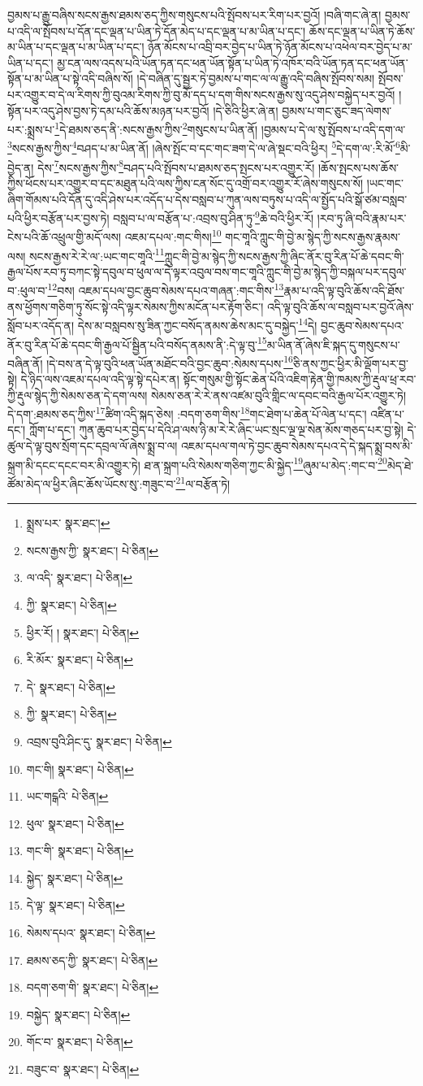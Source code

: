 བྱམས་པ་རྒྱུ་བཞིས་སངས་རྒྱས་ཐམས་ཅད་ཀྱིས་གསུངས་པའི་སྤོབས་པར་རིག་པར་བྱའོ། །བཞི་གང་ཞེ་ན། བྱམས་པ་འདི་ལ་སྤོབས་པ་དོན་དང་ལྡན་པ་ཡིན་ཏེ་དོན་མེད་པ་དང་ལྡན་པ་མ་ཡིན་པ་དང་། ཆོས་དང་ལྡན་པ་ཡིན་ཏེ་ཆོས་མ་ཡིན་པ་དང་ལྡན་པ་མ་ཡིན་པ་དང་། ཉོན་མོངས་པ་འབྲི་བར་བྱེད་པ་ཡིན་ཏེ་ཉོན་མོངས་པ་འཕེལ་བར་བྱེད་པ་མ་ཡིན་པ་དང་། མྱ་ངན་ལས་འདས་པའི་ཡོན་ཏན་དང་ཕན་ཡོན་སྟོན་པ་ཡིན་ཏེ་འཁོར་བའི་ཡོན་ཏན་དང་ཕན་ཡོན་སྟོན་པ་མ་ཡིན་པ་སྟེ་འདི་བཞིས་སོ། །དེ་བཞིན་དུ་སྦྱར་ཏེ་བྱམས་པ་གང་ལ་ལ་རྒྱུ་འདི་བཞིས་སྤོབས་སམ། སྤོབས་པར་འགྱུར་བ་དེ་ལ་རིགས་ཀྱི་བུའམ་རིགས་ཀྱི་བུ་མོ་དད་པ་དག་གིས་སངས་རྒྱས་སུ་འདུ་ཤེས་བསྐྱེད་པར་བྱའོ། །སྟོན་པར་འདུ་ཤེས་བྱས་ཏེ་དམ་པའི་ཆོས་མཉན་པར་བྱའོ། །དེ་ཅིའི་ཕྱིར་ཞེ་ན། བྱམས་པ་གང་ཅུང་ཟད་ལེགས་པར་:སྨྲས་པ་\footnote{སྨྲས་པར་  སྣར་ཐང་། }དེ་ཐམས་ཅད་ནི་:སངས་རྒྱས་ཀྱིས་\footnote{སངས་རྒྱས་ཀྱི་  སྣར་ཐང་།  པེ་ཅིན། }གསུངས་པ་ཡིན་ནོ། །བྱམས་པ་དེ་ལ་སུ་སྤོབས་པ་འདི་དག་ལ་\footnote{ལ་འདི་  སྣར་ཐང་།  པེ་ཅིན། }སངས་རྒྱས་ཀྱིས་\footnote{ཀྱི་  སྣར་ཐང་།  པེ་ཅིན། }བཤད་པ་མ་ཡིན་ནོ། །ཞེས་སྤོང་བ་དང་གང་ཟག་དེ་ལ་ཞེ་སྡང་བའི་ཕྱིར། \footnote{ཕྱིར་རོ། །   སྣར་ཐང་།  པེ་ཅིན། }དེ་དག་ལ་:རི་མོ་\footnote{རི་མོར་  སྣར་ཐང་།  པེ་ཅིན། }མི་བྱེད་ན། དེས་\footnote{དེ་  སྣར་ཐང་།  པེ་ཅིན། }སངས་རྒྱས་ཀྱིས་\footnote{ཀྱི་  སྣར་ཐང་།  པེ་ཅིན། }བཤད་པའི་སྤོབས་པ་ཐམས་ཅད་སྤངས་པར་འགྱུར་རོ། །ཆོས་སྤངས་པས་ཆོས་ཀྱིས་ཕོངས་པར་འགྱུར་བ་དང་མཐུན་པའི་ལས་ཀྱིས་ངན་སོང་དུ་འགྲོ་བར་འགྱུར་རོ་ཞེས་གསུངས་སོ། །ཡང་གང་ཞིག་གོམས་པའི་དོན་དུ་འདི་ཤེས་པར་འདོད་པ་དེས་བསླབ་པ་ཀུན་ལས་བཏུས་པ་འདི་ལ་སྤྱོད་པའི་སྒོ་ཙམ་བསླབ་པའི་ཕྱིར་བརྩོན་པར་བྱས་ཏེ། བསླབ་པ་ལ་བརྩོན་པ་:འབྲས་བུ་ཤིན་ཏུ་\footnote{འབྲས་བུའི་ཤིང་དུ་  སྣར་ཐང་།  པེ་ཅིན། }ཆེ་བའི་ཕྱིར་རོ། །རབ་ཏུ་ཞི་བའི་རྣམ་པར་ངེས་པའི་ཆོ་འཕྲུལ་གྱི་མདོ་ལས། འཇམ་དཔལ་:གང་གིས།\footnote{གང་གི།  སྣར་ཐང་།  པེ་ཅིན། } གང་གཱའི་ཀླུང་གི་བྱེ་མ་སྙེད་ཀྱི་སངས་རྒྱས་རྣམས་ལས། སངས་རྒྱས་རེ་རེ་ལ་:ཡང་གང་གཱའི་\footnote{ཡང་གངྒའི་  པེ་ཅིན། }ཀླུང་གི་བྱེ་མ་སྙེད་ཀྱི་སངས་རྒྱས་ཀྱི་ཞིང་ནོར་བུ་རིན་པོ་ཆེ་དབང་གི་རྒྱལ་པོས་རབ་ཏུ་བཀང་སྟེ་དབུལ་བ་ཕུལ་ལ་དེ་ལྟར་འབུལ་བས་གང་གཱའི་ཀླུང་གི་བྱེ་མ་སྙེད་ཀྱི་བསྐལ་པར་དབུལ་བ་:ཕུལ་བ་\footnote{ཕུལ་  སྣར་ཐང་།  པེ་ཅིན། }བས། འཇམ་དཔལ་བྱང་ཆུབ་སེམས་དཔའ་གཞན་:གང་གིས་\footnote{གང་གི་  སྣར་ཐང་།  པེ་ཅིན། }རྣམ་པ་འདི་ལྟ་བུའི་ཆོས་འདི་ཐོས་ནས་ཕྱོགས་གཅིག་ཏུ་སོང་སྟེ་འདི་ལྟར་སེམས་ཀྱིས་མངོན་པར་རྟོག་ཅིང་། འདི་ལྟ་བུའི་ཆོས་ལ་བསླབ་པར་བྱའོ་ཞེས་སློབ་པར་འདོད་ན། དེས་མ་བསླབས་སུ་ཟིན་ཀྱང་བསོད་ནམས་ཆེས་མང་དུ་བསྐྱེད་\footnote{སྐྱེད་  སྣར་ཐང་།  པེ་ཅིན། }དེ། བྱང་ཆུབ་སེམས་དཔའ་ནོར་བུ་རིན་པོ་ཆེ་དབང་གི་རྒྱལ་པོ་སྦྱིན་པའི་བསོད་ནམས་ནི་:དེ་ལྟ་བུ་\footnote{དེ་ལྟ་  སྣར་ཐང་།  པེ་ཅིན། }མ་ཡིན་ནོ་ཞེས་ཇི་སྐད་དུ་གསུངས་པ་བཞིན་ནོ། །དེ་བས་ན་དེ་ལྟ་བུའི་ཕན་ཡོན་མཐོང་བའི་བྱང་ཆུབ་:སེམས་དཔས་\footnote{སེམས་དཔའ་  སྣར་ཐང་།  པེ་ཅིན། }ཅི་ནས་ཀྱང་ཕྱིར་མི་ལྡོག་པར་བྱ་སྟེ། དེ་ཉིད་ལས་འཇམ་དཔལ་འདི་ལྟ་སྟེ་དཔེར་ན། སྟོང་གསུམ་གྱི་སྟོང་ཆེན་པོའི་འཇིག་རྟེན་གྱི་ཁམས་ཀྱི་རྡུལ་ཕྲ་རབ་ཀྱི་རྡུལ་སྙེད་ཀྱི་སེམས་ཅན་དེ་དག་ལས། སེམས་ཅན་རེ་རེ་ནས་འཛམ་བུའི་གླིང་ལ་དབང་བའི་རྒྱལ་པོར་འགྱུར་ཏེ། དེ་དག་:ཐམས་ཅད་ཀྱིས་\footnote{ཐམས་ཅད་ཀྱི་  སྣར་ཐང་།  པེ་ཅིན། }ཚིག་འདི་སྐད་ཅེས། :བདག་ཅག་གིས་\footnote{བདག་ཅག་གི་  སྣར་ཐང་།  པེ་ཅིན། }གང་ཐེག་པ་ཆེན་པོ་ལེན་པ་དང་། འཛིན་པ་དང་། ཀློག་པ་དང་། ཀུན་ཆུབ་པར་བྱེད་པ་དེའི་ཤ་ལས་ཉི་མ་རེ་རེ་ཞིང་ཡང་སྲང་ལྔ་ལྔ་སེན་མོས་གཅད་པར་བྱ་སྟེ། དེ་ཚུལ་དེ་ལྟ་བུས་སྲོག་དང་དབྲལ་ལོ་ཞེས་སྨྲ་བ་ལ། འཇམ་དཔལ་གལ་ཏེ་བྱང་ཆུབ་སེམས་དཔའ་དེ་དེ་སྐད་སྨྲ་བས་མི་སྐྲག་མི་དངང་དངང་བར་མི་འགྱུར་ཏེ། ཐ་ན་སྐྲག་པའི་སེམས་གཅིག་ཀྱང་མི་སྐྱེད་\footnote{བསྐྱེད་  སྣར་ཐང་།  པེ་ཅིན། }ཞུམ་པ་མེད་:གང་བ་\footnote{གོང་བ་  སྣར་ཐང་།  པེ་ཅིན། }མེད་ཐེ་ཚོམ་མེད་ལ་ཕྱིར་ཞིང་ཆོས་ཡོངས་སུ་:གཟུང་བ་\footnote{བཟུང་བ་  སྣར་ཐང་།  པེ་ཅིན། }ལ་བརྩོན་ཏེ། 